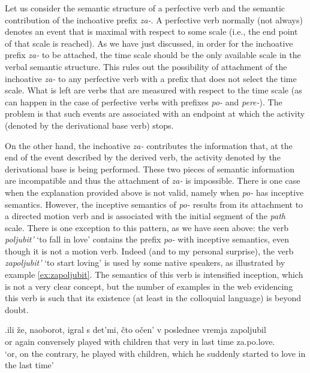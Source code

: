 Let us consider the semantic structure of a perfective verb and the semantic contribution of the inchoative prefix \textit{za-}. A perfective verb normally (not always) denotes an event that is maximal with respect to some scale (i.e., the end point of that scale is reached). As we have just discussed, in order for the inchoative prefix \textit{za-} to be attached, the time scale should be the only available scale in the verbal semantic structure. This rules out the possibility of attachment of the inchoative \textit{za-} to any perfective verb with a prefix that does not select the time scale. What is left are verbs that are measured with respect to the time scale (as can happen in the case of perfective verbs with prefixes \textit{po-} and \textit{pere-}). The problem is that such events are associated with an endpoint at which the activity (denoted by the derivational base verb) stops. 

On the other hand, the inchoative \textit{za-} contributes the information that, at the end of the event described by the derived verb, the activity denoted by the derivational base is being performed. These two pieces of semantic information are incompatible and thus the attachment of \textit{za-} is impossible. There is one case when the explanation provided above is not valid, namely when \textit{po-} has inceptive semantics. However, the inceptive semantics of \textit{po-} results from its attachment to a directed motion verb and is associated with the initial segment of the \textit{path} scale. There is one exception to this pattern, as we have seen above: the verb \textit{poljubit'} `to fall in love' contains the prefix \textit{po-} with inceptive semantics, even though it is not a motion verb. Indeed (and to my personal surprise), the verb \textit{zapoljubit'} `to start loving' is used by some native speakers, as illustrated by example \ref{ex:zapoljubit}. The semantics of this verb is intensified inception, which is not a very clear concept, but the number of examples in the web evidencing this verb is such that its existence (at least in the colloquial language) is beyond doubt.

\exg.\label{ex:zapoljubit}ili \v{z}e, naoborot, igral s det'mi, \v{c}to o\v{c}en' v poslednee vremja zapoljubil\\
or again conversely played with children that very in last time za.po.love.\\
\trans `or, on the contrary, he played with children, which he suddenly started to love in the last time'

